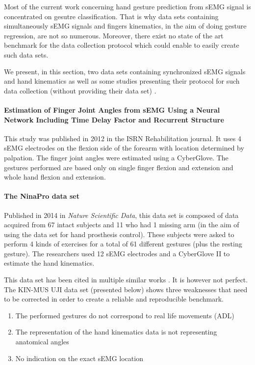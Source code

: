 \documentclass{article}
\begin{document}
Most of the current work concerning hand gesture prediction from sEMG signal is concentrated on gesutre classification. That is why data sets containing simultaneously sEMG signals and fingers kinematics, in the aim of doing gesture regression, are not so numerous. Moreover, there exist no state of the art benchmark for the data collection protocol which could enable to easily create such data sets.


We present, in this section, two data sets containing synchronized sEMG signals and hand kinematics \cite{ref:ninapro, ref:KinMusUji} as well as some studies presenting their protocol for such data collection (without providing their data set) \cite{ref:Ngeo2014, ref:Hioki2012}.


\paragraph{Estimation of Finger Joint Angles from sEMG Using a Neural Network Including Time Delay Factor and Recurrent Structure \cite{ref:Hioki2012}}

This study was published in 2012 in the ISRN Rehabilitation journal. It uses 4 sEMG electrodes on the flexion side of the forearm with location determined by palpation. The finger joint angles were estimated using a CyberGlove. The gestures performed are based only on single finger flexion and extension and whole hand flexion and extension.

\paragraph{The NinaPro data set \cite{ref:ninapro}}

Published in 2014 in \textit{Nature Scientific Data}, this data set is composed of data acquired from 67 intact subjects and 11 who had 1 missing arm (in the aim of using the data set for hand prosthesis control). These subjects were asked to perform 4 kinds of exercises for a total of 61 different gestures (plus the resting gesture). The researchers used 12 sEMG electrodes and a CyberGlove II to estimate the hand kinematics.

This data set has been cited in multiple similar works \cite{ref:KinMusUji, ref:comp6EMGsetup}. It is however not perfect. The KIN-MUS UJI data set (presented below) shows three weaknesses that need to be corrected in order to create a reliable and reproducible benchmark.
\begin{enumerate}
    \item The performed gestures do not correspond to real life movements (ADL)
    \item The representation of the hand kinematics data is not representing anatomical angles
    \item No indication on the exact sEMG location
\end{enumerate}
\end{document}
